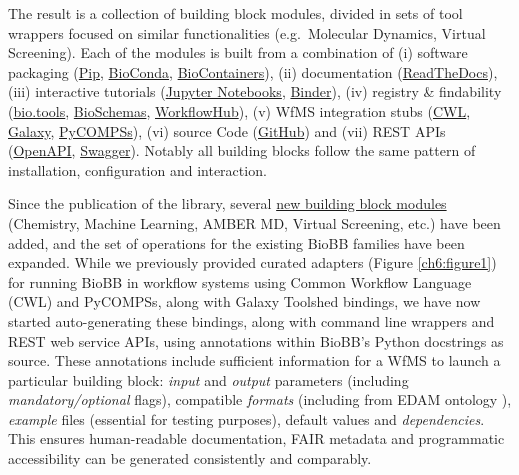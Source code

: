 The result is a collection of building block modules, divided in sets of
tool wrappers focused on similar functionalities (e.g.~Molecular
Dynamics, Virtual Screening). Each of the modules is built from a
combination of (i) software packaging
(\href{https://pypi.org/project/biobb/}{Pip},
\href{https://bioconda.github.io/search.html?q=biobb}{BioConda},
\href{https://biocontainers.pro/}{BioContainers}), (ii) documentation
(\href{https://biobb.readthedocs.io/}{ReadTheDocs}), (iii) interactive
tutorials
(\href{http://mmb.irbbarcelona.org/biobb/workflows/tutorials/md_setup}{Jupyter
Notebooks},
\href{https://bioexcel-binder.tsi.ebi.ac.uk/v2/gh/bioexcel/biobb_wf_md_setup/master?filepath=biobb_wf_md_setup\%2Fnotebooks\%2Fbiobb_MDsetup_tutorial.ipynb}{Binder}),
(iv) registry \& findability (\href{https://bio.tools/biobb}{bio.tools},
\href{https://bioschemas.org/profiles/ComputationalTool/0.5-DRAFT/}{BioSchemas},
\href{https://workflowhub.eu/programmes/2}{WorkflowHub}), (v) WfMS
integration stubs
(\href{https://github.com/bioexcel/biobb_adapters/tree/v0.1.4/biobb_adapters/cwl}{CWL},
\href{https://toolshed.g2.bx.psu.edu/repository?repository_id=e23296b413014cfc}{Galaxy},
\href{https://github.com/bioexcel/biobb_adapters/tree/v0.1.4/biobb_adapters/pycompss}{PyCOMPSs}),
(vi) source Code (\href{https://github.com/bioexcel/biobb}{GitHub}) and
(vii) REST APIs
(\href{https://mmb.irbbarcelona.org/biobb-api/rest}{OpenAPI},
\href{https://mmb.irbbarcelona.org/biobb-api/rest/swagger.json}{Swagger}).
Notably all building blocks follow the same pattern of installation,
configuration and interaction.

Since the publication of the library, several
\href{https://mmb.irbbarcelona.org/biobb/documentation/source}{new
building block modules} (Chemistry, Machine Learning, AMBER MD, Virtual
Screening, etc.) have been added, and the set of operations for the
existing BioBB families have been expanded. While we previously provided
curated adapters (Figure \vref{ch6:figure1}) for running BioBB in workflow systems using
Common Workflow Language (CWL) and PyCOMPSs, along with Galaxy Toolshed
bindings, we have now started auto-generating these bindings, along with
command line wrappers and REST web service APIs, using annotations
within BioBB's Python docstrings as source. These annotations include
sufficient information for a WfMS to launch a particular building block:
\emph{input} and \emph{output} parameters (including
\emph{mandatory/optional} flags), compatible \emph{formats} (including
from EDAM ontology \cite{ch6-11}), \emph{example} files (essential for
testing purposes), default values and \emph{dependencies}. This ensures
human-readable documentation, FAIR metadata and programmatic
accessibility can be generated consistently and comparably.

